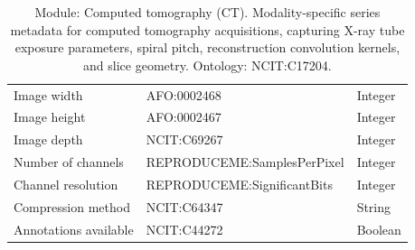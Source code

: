 \documentclass{article}
\begin{document}
\begin{table}[htb]
\begin{tabular}{lll}
Image width & AFO:0002468 & Integer \\
Image height & AFO:0002467 & Integer \\
Image depth & NCIT:C69267 & Integer \\
Number of channels & REPRODUCEME:SamplesPerPixel & Integer \\
Channel resolution & REPRODUCEME:SignificantBits & Integer \\
Compression method & NCIT:C64347 & String \\
Annotations available & NCIT:C44272 & Boolean \\
\hline
\end{tabular}
\caption[Module: Computed tomography (CT)]{\label{table:table16} Module: Computed tomography (CT). Modality-specific series metadata for computed tomography acquisitions, capturing X-ray tube exposure parameters, spiral pitch, reconstruction convolution kernels, and slice geometry. Ontology: NCIT:C17204. }
\end{table}
\end{document}
